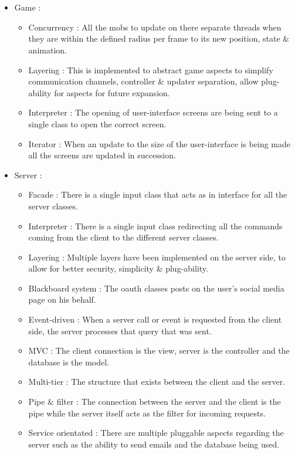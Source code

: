 \documentclass[letterpaper]{article}
\begin{document}
		\vspace{0.2in}
			
			
			
		\vspace{0.2in}
		\section*{\colorbox{black}{}}
		\vspace{0.1in}
		\begin{itemize}
		\item Game :
		\begin{itemize}
		\item Concurrency : All the mobs to update on there separate threads when they are within the defined radius per frame to its new position, state \& animation.
		\item Layering : This is implemented to abstract game aspects to simplify communication channels, controller \& updater separation, allow plug-ability for aspects for future expansion.
		\item Interpreter : The opening of user-interface screens are being sent to a single class to open the correct screen.
		\item Iterator : When an update to the size of the user-interface is being made all the screens are updated in succession.
		\end{itemize}
		\item Server :
		\begin{itemize}
		\item Facade : There is a single input class that acts as in interface for all the server classes.
		\item Interpreter : There is a single input class redirecting all the commands coming from the client to the different server classes.
		\item Layering : Multiple layers have been implemented on the server side, to allow for better security, simplicity \& plug-ability.
		\item Blackboard system : The oauth classes posts on the user's social media page on his behalf.
		\item Event-driven : When a server call or event is requested from the client side, the server processes that query that was sent. 
		\item MVC : The client connection is the view, server is the controller and the database is the model.
		\item Multi-tier : The structure that exists between the client and the server.
		\item Pipe \& filter : The connection between the server and the client is the pipe while the server itself acts as the filter for incoming requests.
		\item Service orientated : There are multiple pluggable aspects regarding the server such as the ability to send emails and the database being used.
		\end{itemize}
		\end{itemize}
		\vspace{0.2in}
\end{document}
